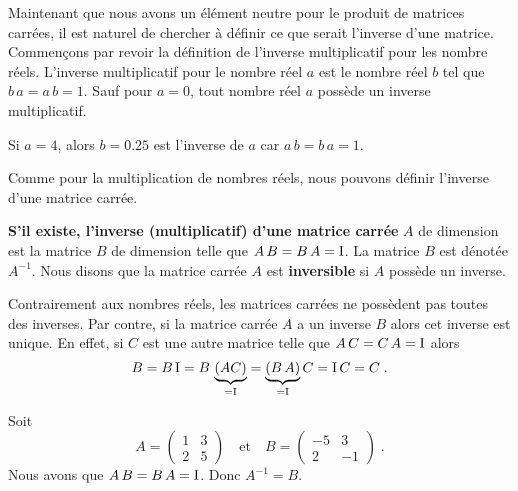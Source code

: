 {Maintenant que nous avons un élément neutre pour le produit de matrices
carrées, il est naturel de chercher à définir ce que serait l'inverse
d'une matrice. Commençons par revoir la définition de l'inverse
multiplicatif pour les nombre réels.  L'inverse multiplicatif pour le
nombre réel $a$ est le nombre réel $b$ tel que $b\,a=a\,b =1$.  Sauf
pour $a=0$, tout nombre réel $a$ possède un inverse multiplicatif.

\begin{egg}
Si $a = 4$, alors $b = 0.25$ est l'inverse de $a$ car $a\,b= b\,a = 1$.
\end{egg}

Comme pour la multiplication de nombres réels, nous pouvons définir
l'inverse d'une matrice carrée.

\begin{defn}
{\bfseries S'il existe, l'inverse (multiplicatif) d'une matrice carrée}
 $A$ de
dimension \nn est la matrice $B$ de dimension \nn telle que
$A\,B = B\, A = \operatorname{I}$.  La matrice $B$ est dénotée $A^{-1}$.  Nous disons
que la matrice carrée $A$ est {\bfseries inversible} si $A$ possède un
inverse.
\end{defn}

Contrairement aux nombres réels, les matrices carrées ne possèdent pas
toutes des inverses.  Par contre, si la matrice carrée $A$ a un
inverse $B$ alors cet inverse est unique.  En effet, si $C$ est une
autre matrice telle que $A\, C = C\, A = \operatorname{I}$ alors
\[
B = B \operatorname{I} = B\, \underbrace{(A C)}_{=\operatorname{I}}
= \underbrace{(B\, A)}_{=\operatorname{I}} C = \operatorname{I} C = C \; .
\]

\begin{egg}
Soit
\[
A = \begin{pmatrix} 1 & 3 \\ 2 & 5 \end{pmatrix}
\quad \text{et} \quad
B = \begin{pmatrix} -5 & 3 \\ 2 & -1 \end{pmatrix} \; .
\]
Nous avons que $A\,B = B\, A = \operatorname{I}$.  Donc $A^{-1} = B$.
\end{egg}

}
